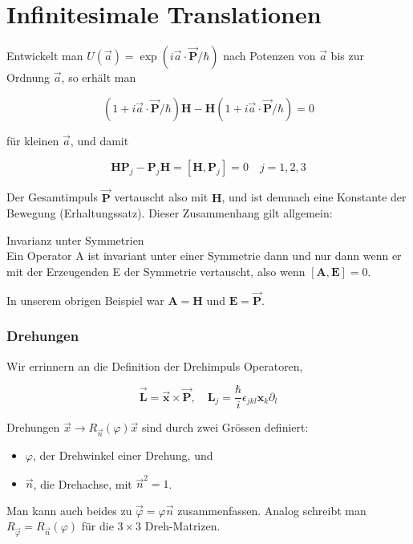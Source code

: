 \documentclass[10pt, letterpaper]{article}
\begin{document}
\section*{Infinitesimale Translationen}
Entwickelt man $U(\vec{a})=\exp (i \vec{a} \cdot \overrightarrow{\mathbf{P}} / \hbar)$ nach Potenzen von $\vec{a}$ bis zur Ordnung $\vec{a}$, so erhält man

$$
(1+i \vec{a} \cdot \overrightarrow{\mathbf{P}} / \hbar) \mathbf{H}-\mathbf{H}(1+i \vec{a} \cdot \overrightarrow{\mathbf{P}} / \hbar)=0
$$

für kleinen $\vec{a}$, und damit

$$
\mathbf{H} \mathbf{P}_{j}-\mathbf{P}_{j} \mathbf{H}=\left[\mathbf{H}, \mathbf{P}_{j}\right]=0 \quad j=1,2,3
$$

Der Gesamtimpuls $\overrightarrow{\mathbf{P}}$ vertauscht also mit $\mathbf{H}$, und ist demnach eine Konstante der Bewegung (Erhaltungssatz). Dieser Zusammenhang gilt allgemein:

Invarianz unter Symmetrien\\
Ein Operator A ist invariant unter einer Symmetrie dann und nur dann wenn er mit der Erzeugenden E der Symmetrie vertauscht, also wenn $[\mathbf{A}, \mathbf{E}]=0$.

In unserem obrigen Beispiel war $\mathbf{A}=\mathbf{H}$ und $\mathbf{E}=\overrightarrow{\mathbf{P}}$.

\subsubsection*{Drehungen}
Wir errinnern an die Definition der Drehimpuls Operatoren,

$$
\overrightarrow{\mathbf{L}}=\overrightarrow{\mathbf{x}} \times \overrightarrow{\mathbf{P}}, \quad \mathbf{L}_{j}=\frac{\hbar}{i} \epsilon_{j k l} \mathbf{x}_{k} \partial_{l}
$$

Drehungen $\vec{x} \rightarrow R_{\vec{n}}(\varphi) \vec{x}$ sind durch zwei Grössen definiert:

\begin{itemize}
  \item $\varphi$, der Drehwinkel einer Drehung, und
  \item $\vec{n}$, die Drehachse, mit $\vec{n}^{2}=1$.
\end{itemize}

Man kann auch beides zu $\vec{\varphi}=\varphi \vec{n}$ zusammenfassen. Analog schreibt man $R_{\vec{\varphi}}=R_{\vec{n}}(\varphi)$ für die $3 \times 3$ Dreh-Matrizen.
\end{document}
